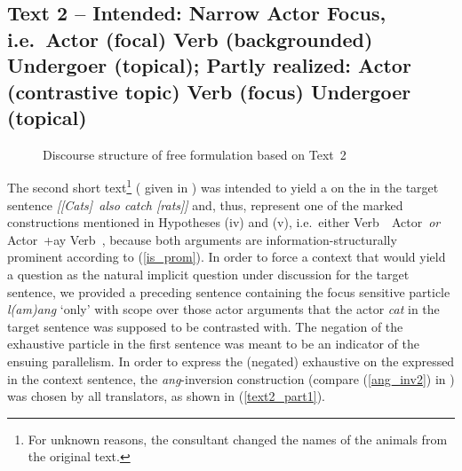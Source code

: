 \documentclass[output=paper,
,modfonts
,nonflat]{langsci/langscibook}
\begin{document}
\subsection{Text 2 -- Intended: Narrow Actor Focus, i.e.\ Actor (focal) Verb (backgrounded) Undergoer (topical); Partly realized: Actor (contrastive topic) Verb (focus) Undergoer (topical)}\label{sect:narrow_actor_focus}

\begin{figure}
\caption{Discourse structure of free formulation based on Text~2}
\label{fig:text2_analysis}
\end{figure}

\noindent The second short text\footnote{For unknown reasons, the consultant changed the names of the animals from the original text.} ( given in ) was intended to yield a  on the  in the target sentence \textit{[[Cats]\focus\ also catch [rats]\topic]\sq} and, thus, represent one of the marked constructions mentioned in Hypotheses (iv) and (v), i.e.\ either Verb\av\ \topic\  Actor\focus\ \textit{or} Actor\focus\ +ay Verb\uv\ \topic, because both arguments are information-structurally prominent according to (\ref{is_prom}). In order to force a context that would yield a  question as the natural implicit question under discussion for the target sentence, we provided a preceding sentence containing the focus sensitive particle \textit{l(am)ang} `only' with scope over those actor arguments that the actor \textit{cat} in the target sentence was supposed to be contrasted with. The negation of the exhaustive particle in the first sentence was meant to be an indicator of the ensuing parallelism. In order to express the (negated) exhaustive  on the  expressed in the context sentence, the \textit{ang}-inversion construction (compare (\ref{ang_inv2}) in ) was chosen by all  translators, as shown in (\ref{text2_part1}).
\end{document}
